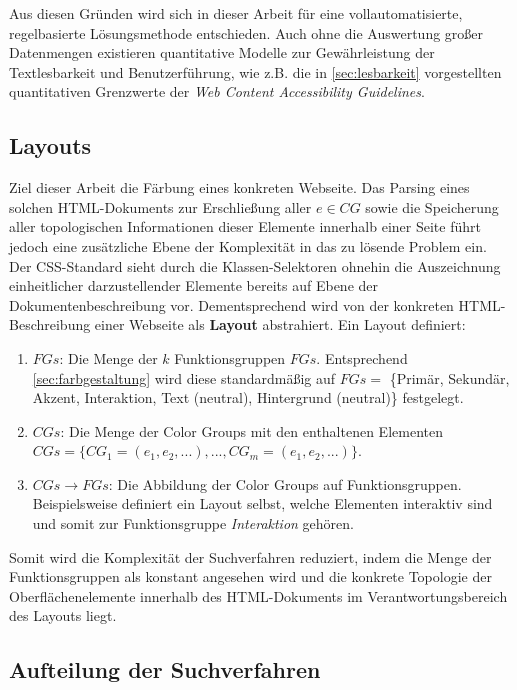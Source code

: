 Aus diesen Gründen wird sich in dieser Arbeit für eine vollautomatisierte, regelbasierte Lösungsmethode entschieden. Auch ohne die Auswertung großer Datenmengen existieren quantitative Modelle zur Gewährleistung der Textlesbarkeit und Benutzerführung, wie z.B. die in \ref{sec:lesbarkeit} vorgestellten quantitativen Grenzwerte der \emph{Web Content Accessibility Guidelines}.

\subsection{Layouts}
\label{sec:layouts}

Ziel dieser Arbeit die Färbung eines konkreten Webseite. Das Parsing eines solchen HTML-Dokuments zur Erschließung aller $e \in CG$ sowie die Speicherung aller topologischen Informationen dieser Elemente innerhalb einer Seite führt jedoch eine zusätzliche Ebene der Komplexität in das zu lösende Problem ein. Der CSS-Standard sieht durch die Klassen-Selektoren \citep{css3-selectors} ohnehin die Auszeichnung einheitlicher darzustellender Elemente bereits auf Ebene der Dokumentenbeschreibung vor. Dementsprechend wird von der konkreten HTML-Beschreibung einer Webseite als  \textbf{Layout} abstrahiert. Ein Layout definiert:

\begin{enumerate}
	\item $FGs$: Die Menge der $k$ Funktionsgruppen $FGs$. Entsprechend \autoref{sec:farbgestaltung} wird diese standardmäßig auf $FGs = $ \{Primär, Sekundär, Akzent, Interaktion, Text (neutral), Hintergrund (neutral)\} festgelegt.
	\item $CGs$: Die Menge der Color Groups mit den enthaltenen Elementen $CGs = \{CG_1 = (e_1, e_2, ...), ..., CG_m = (e_1, e_2, ...)\}$.
 	\item $CGs \to FGs$: Die Abbildung der Color Groups auf Funktionsgruppen. Beispielsweise definiert ein Layout selbst, welche Elementen interaktiv sind und somit zur Funktionsgruppe \emph{Interaktion} gehören.
\end{enumerate}

Somit wird die Komplexität der Suchverfahren reduziert, indem die Menge der Funktionsgruppen als konstant angesehen wird und die konkrete Topologie der Oberflächenelemente innerhalb des HTML-Dokuments im Verantwortungsbereich des Layouts liegt.

\subsection{Aufteilung der Suchverfahren}
\label{sec:aufteilung}

